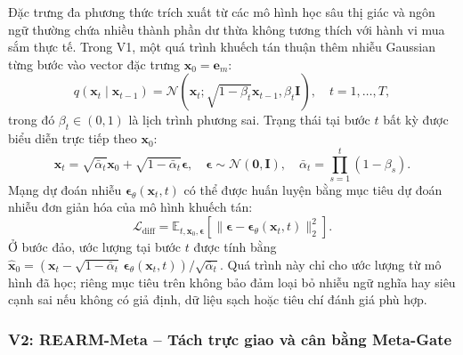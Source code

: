 Đặc trưng đa phương thức trích xuất từ các mô hình học sâu thị giác và ngôn ngữ thường chứa nhiều thành phần dư thừa không tương thích với hành vi mua sắm thực tế. Trong V1, một quá trình khuếch tán thuận thêm nhiễu Gaussian từng bước vào vector đặc trưng $\mathbf{x}_0 = \mathbf{e}_m$:
\begin{equation}
q(\mathbf{x}_t \mid \mathbf{x}_{t-1}) = \mathcal{N}\left(\mathbf{x}_t; \sqrt{1 - \beta_t}\mathbf{x}_{t-1}, \beta_t \mathbf{I}\right), \quad t = 1, \dots, T,
\end{equation}
trong đó $\beta_t \in (0, 1)$ là lịch trình phương sai. Trạng thái tại bước $t$ bất kỳ được biểu diễn trực tiếp theo $\mathbf{x}_0$:
\begin{equation}
\mathbf{x}_t = \sqrt{\bar{\alpha}_t}\mathbf{x}_0 + \sqrt{1 - \bar{\alpha}_t}\boldsymbol{\epsilon}, \quad \boldsymbol{\epsilon} \sim \mathcal{N}(\mathbf{0}, \mathbf{I}), \quad \bar{\alpha}_t = \prod_{s=1}^t (1 - \beta_s).
\end{equation}
Mạng dự đoán nhiễu $\boldsymbol{\epsilon}_\theta(\mathbf{x}_t, t)$ có thể được huấn luyện bằng mục tiêu dự đoán nhiễu đơn giản hóa của mô hình khuếch tán:
\begin{equation}
\mathcal{L}_{\text{diff}} = \mathbb{E}_{t, \mathbf{x}_0, \boldsymbol{\epsilon}}\left[\|\boldsymbol{\epsilon} - \boldsymbol{\epsilon}_\theta(\mathbf{x}_t, t)\|_2^2\right].
\end{equation}
Ở bước đảo, ước lượng tại bước $t$ được tính bằng $\hat{\mathbf{x}}_0 = (\mathbf{x}_t - \sqrt{1-\bar{\alpha}_t}\,\boldsymbol{\epsilon}_\theta(\mathbf{x}_t,t))/\sqrt{\bar{\alpha}_t}$. Quá trình này chỉ cho ước lượng từ mô hình đã học; riêng mục tiêu trên không bảo đảm loại bỏ nhiễu ngữ nghĩa hay siêu cạnh sai nếu không có giả định, dữ liệu sạch hoặc tiêu chí đánh giá phù hợp.

\subsubsection{V2: REARM-Meta -- Tách trực giao và cân bằng Meta-Gate}


